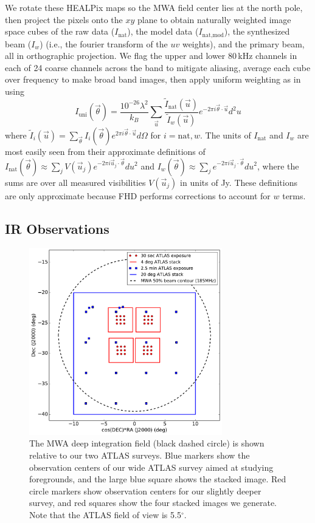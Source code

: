\documentclass[numberedappendix]{emulateapj}
\begin{document}
We rotate these HEALPix maps so the MWA field center lies at the north pole, then project the pixels onto the $xy$ plane to obtain naturally weighted image space cubes of the raw data ($I_\text{nat}$), the model data ($I_\text{nat,mod}$), the synthesized beam ($I_w$) (i.e., the fourier transform of the $uv$ weights), and the primary beam, all in orthographic projection. We flag the upper and lower 80\,kHz channels in each of 24 coarse channels across the band to mitigate aliasing, average each cube over frequency to make broad band images, then apply uniform weighting as in \citet{dillonneben} using
\begin{equation}
\label{eqn:uniformweighting}
I_\text{uni}(\vec{\theta}) = \frac{10^{-26}\lambda^2}{k_B } \sum_{\vec{u}} \frac{\tilde{I}_\text{nat}(\vec{u})}{\tilde{I}_w(\vec{u})} e^{-2\pi i \vec{\theta}\cdot\vec{u}}d^2u
\end{equation}
where $\tilde{I}_i(\vec{u}) = \sum_{\vec{\theta}} I_i(\vec{\theta}) e^{2\pi i\vec{\theta}\cdot\vec{u}} d\Omega$ for $i=\text{nat},w$. The units of $I_\text{nat}$ and $I_w$ are most easily seen from their approximate definitions of $I_\text{nat}(\vec{\theta})\approx\sum_j V(\vec{u}_j)e^{-2\pi i\vec{u}_j\cdot\vec{\theta}}du^2$ and $I_w(\vec{\theta})\approx\sum_j e^{-2\pi i\vec{u}_j\cdot\vec{\theta}}du^2$, where the sums are over all measured visibilities $V(\vec{u}_j)$ in units of Jy. These definitions are only approximate because FHD performs corrections to account for $w$ terms.

\subsection{IR Observations}

\begin{figure}[h]
\centering
\includegraphics[width=3.3in]{survey_overview.pdf}
\caption[Diagram of the MWA deep integration field and our ATLAS surveys.]{The MWA deep integration field (black dashed circle) is shown relative to our two ATLAS surveys. Blue markers show the observation centers of our wide ATLAS survey aimed at studying foregrounds, and the large blue square shows the stacked image. Red circle markers show observation centers for our slightly deeper survey, and red squares show the four stacked images we generate. Note that the ATLAS field of view is 5.5$^\circ$.}
\label{fig:surveyoverview}
\end{figure}
\end{document}
